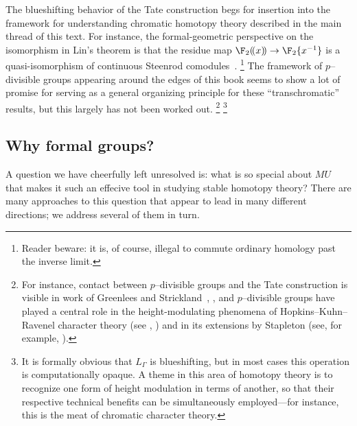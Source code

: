 The blueshifting behavior of the Tate construction begs for insertion into the framework for understanding chromatic homotopy theory described in the main thread of this text.
For instance, the formal-geometric perspective on the isomorphism in Lin's theorem is that the residue map \(\F_2(\!(x)\!) \to \F_2\{x^{-1}\}\) is a quasi-isomorphism of continuous Steenrod comodules~\cite[Remark 8.34]{StricklandFSFG}.%
\footnote{%
Reader beware: it is, of course, illegal to commute ordinary homology past the inverse limit.
}
The framework of \(p\)--divisible groups appearing around the edges of this book seems to show a lot of promise for serving as a general organizing principle for these ``transchromatic'' results, but this largely has not been worked out.%
\footnote{%
For instance, contact between \(p\)--divisible groups and the Tate construction is visible in work of Greenlees and Strickland~\cite{GreenleesStrickland}, \cite[pg.\ 10]{StricklandFPFP}, and \(p\)--divisible groups have played a central role in the height-modulating phenomena of Hopkins--Kuhn--Ravenel character theory (see , \cite{HKR}) and in its extensions by Stapleton (see, for example, \cite{Stapleton,StapletonTwisted}).
}%
\footnote{%
It is formally obvious that \(L_\Gamma\) is blueshifting, but in most cases this operation is computationally opaque.
A theme in this area of homotopy theory is to recognize one form of height modulation in terms of another, so that their respective technical benefits can be simultaneously employed---for instance, this is the meat of chromatic character theory.
}






\subsection*{Why formal groups?}

A question we have cheerfully left unresolved is: what is so special about \(MU\) that makes it such an effecive tool in studying stable homotopy theory?
There are many approaches to this question that appear to lead in many different directions; we address several of them in turn.

